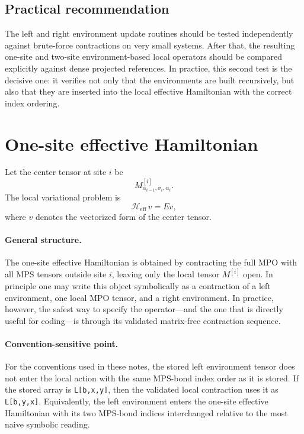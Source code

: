 \documentclass[aps,prb,onecolumn,nofootinbib]{revtex4-2}
\begin{document}
	\subsection{Practical recommendation}
	
	The left and right environment update routines should be tested independently against
	brute-force contractions on very small systems. After that, the resulting one-site and
	two-site environment-based local operators should be compared explicitly against dense
	projected references. In practice, this second test is the decisive one: it verifies not
	only that the environments are built recursively, but also that they are inserted into the
	local effective Hamiltonian with the correct index ordering.
	
	\section{One-site effective Hamiltonian}
	
	Let the center tensor at site $i$ be
	\[
	M^{[i]}_{\alpha_{i-1},\sigma_i,\alpha_i}.
	\]
	The local variational problem is
	\begin{equation}
		\mathcal{H}_{\mathrm{eff}}\,v = E v,
	\end{equation}
	where $v$ denotes the vectorized form of the center tensor.
	
	\paragraph{General structure.}
	The one-site effective Hamiltonian is obtained by contracting the full MPO with all
	MPS tensors outside site $i$, leaving only the local tensor $M^{[i]}$ open.
	In principle one may write this object symbolically as a contraction of a left environment,
	one local MPO tensor, and a right environment. In practice, however, the safest way to
	specify the operator---and the one that is directly useful for coding---is through its
	validated matrix-free contraction sequence.
	
	\paragraph{Convention-sensitive point.}
	For the conventions used in these notes, the stored left environment tensor does not enter
	the local action with the same MPS-bond index order as it is stored. If the stored array is
	\texttt{L[b,x,y]}, then the validated local contraction uses it as \texttt{L[b,y,x]}.
	Equivalently, the left environment enters the one-site effective Hamiltonian with its two
	MPS-bond indices interchanged relative to the most naive symbolic reading.
	
\end{document}
